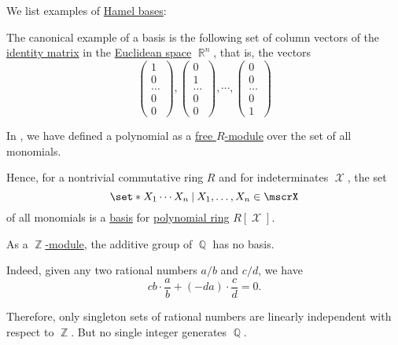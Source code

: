 \begin{example}\label{ex:def:hamel_basis}
  We list examples of \hyperref[def:hamel_basis]{Hamel bases}:
  \begin{thmenum}
     The canonical example of a basis is the following set of column vectors of the \hyperref[eq:thm:matrix_algebra/matrix_multiplication/identity]{identity matrix} in the \hyperref[def:euclidean_space]{Euclidean space} \( \BbbR^n \), that is, the vectors
    \begin{equation*}
      \begin{pmatrix}
        1 \\ 0 \\ \ldots \\ 0 \\ 0
      \end{pmatrix}
      ,
      \begin{pmatrix}
        0 \\ 1 \\ \ldots \\ 0 \\ 0
      \end{pmatrix}
      ,
      \cdots
      ,
      \begin{pmatrix}
        0 \\ 0 \\ \ldots \\ 0 \\ 1
      \end{pmatrix}
    \end{equation*}

     In , we have defined a polynomial as a \hyperref[def:free_semimodule]{free \( R \)-module} over the set of all monomials.

    Hence, for a nontrivial commutative ring \( R \) and for indeterminates \( \mscrX \), the set
    \begin{equation*}
      \set*{ X_1 \cdots X_n \given X_1, \ldots, X_n \in \mscrX }
    \end{equation*}
    of all monomials is a \hyperref[def:hamel_basis]{basis} for \hyperref[def:polynomial_algebra]{polynomial ring} \( R[\mscrX] \).

     As a \hyperref[thm:abelian_group_is_module]{\( \BbbZ \)-module}, the additive group of \( \BbbQ \) has no basis.

    Indeed, given any two rational numbers \( a / b \) and \( c / d \), we have
    \begin{equation*}
      cb \cdot \frac a b + (-da) \cdot \frac c d = 0.
    \end{equation*}

    Therefore, only singleton sets of rational numbers are linearly independent with respect to \( \BbbZ \). But no single integer generates \( \BbbQ \).
  \end{thmenum}
\end{example}

